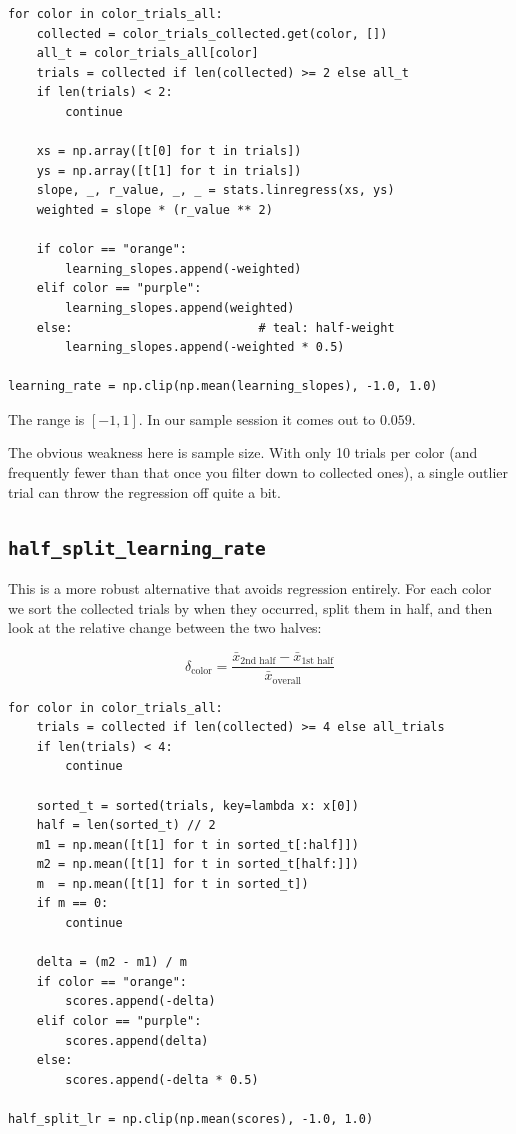 \documentclass[11pt,a4paper]{article}
\begin{document}
\begin{lstlisting}[style=pythonstyle,caption={Regression-based learning rate (Python).}]
for color in color_trials_all:
    collected = color_trials_collected.get(color, [])
    all_t = color_trials_all[color]
    trials = collected if len(collected) >= 2 else all_t
    if len(trials) < 2:
        continue

    xs = np.array([t[0] for t in trials])
    ys = np.array([t[1] for t in trials])
    slope, _, r_value, _, _ = stats.linregress(xs, ys)
    weighted = slope * (r_value ** 2)

    if color == "orange":
        learning_slopes.append(-weighted)
    elif color == "purple":
        learning_slopes.append(weighted)
    else:                          # teal: half-weight
        learning_slopes.append(-weighted * 0.5)

learning_rate = np.clip(np.mean(learning_slopes), -1.0, 1.0)
\end{lstlisting}

The range is $[-1, 1]$. In our sample session it comes out to $0.059$.

The obvious weakness here is sample size. With only 10 trials per color
(and frequently fewer than that once you filter down to collected ones), a single
outlier trial can throw the regression off quite a bit.


\subsection{\texttt{half\_split\_learning\_rate}}

This is a more robust alternative that avoids regression entirely. For each color
we sort the collected trials by when they occurred, split them in half, and
then look at the relative change between the two halves:

\begin{equation}
    \delta_\text{color} = \frac{\bar{x}_{\text{2nd half}} - \bar{x}_{\text{1st half}}}
                                {\bar{x}_{\text{overall}}}
\end{equation}

\begin{lstlisting}[style=pythonstyle,caption={Half-split learning rate (Python).}]
for color in color_trials_all:
    trials = collected if len(collected) >= 4 else all_trials
    if len(trials) < 4:
        continue

    sorted_t = sorted(trials, key=lambda x: x[0])
    half = len(sorted_t) // 2
    m1 = np.mean([t[1] for t in sorted_t[:half]])
    m2 = np.mean([t[1] for t in sorted_t[half:]])
    m  = np.mean([t[1] for t in sorted_t])
    if m == 0:
        continue

    delta = (m2 - m1) / m
    if color == "orange":
        scores.append(-delta)
    elif color == "purple":
        scores.append(delta)
    else:
        scores.append(-delta * 0.5)

half_split_lr = np.clip(np.mean(scores), -1.0, 1.0)
\end{lstlisting}
\end{document}
